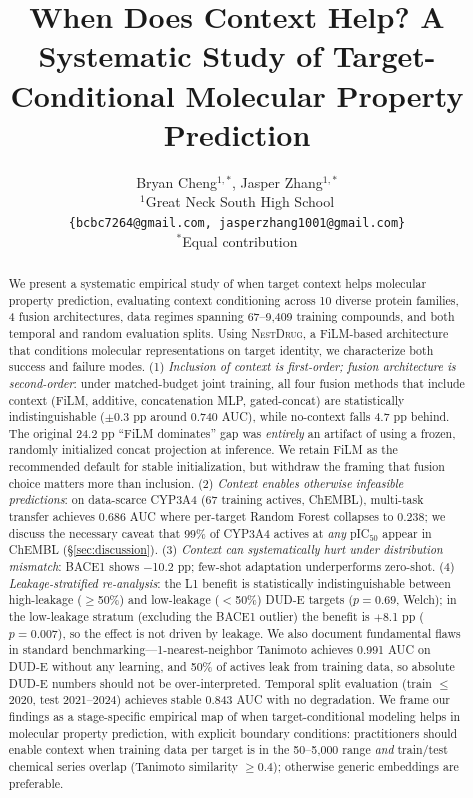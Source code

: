 \documentclass{article}
\title{When Does Context Help? A Systematic Study of Target-Conditional Molecular Property Prediction}
\author{Bryan Cheng$^{1,*}$, Jasper Zhang$^{1,*}$ \\
$^{1}$Great Neck South High School \\
\texttt{\{bcbc7264@gmail.com, jasperzhang1001@gmail.com\}} \\
$^{*}$Equal contribution
}
\newcommand{\methodname}{\textsc{NestDrug}}
\begin{document}
\maketitle
{}

\begin{abstract}
We present a systematic empirical study of when target context helps molecular property prediction, evaluating context conditioning across 10 diverse protein families, 4 fusion architectures, data regimes spanning 67--9,409 training compounds, and both temporal and random evaluation splits. Using \methodname{}, a FiLM-based architecture that conditions molecular representations on target identity, we characterize both success and failure modes. (1) \textit{Inclusion of context is first-order; fusion architecture is second-order}: under matched-budget joint training, all four fusion methods that include context (FiLM, additive, concatenation MLP, gated-concat) are statistically indistinguishable ($\pm 0.3$ pp around 0.740 AUC), while no-context falls 4.7 pp behind. The original 24.2 pp ``FiLM dominates'' gap was \emph{entirely} an artifact of using a frozen, randomly initialized concat projection at inference. We retain FiLM as the recommended default for stable initialization, but withdraw the framing that fusion choice matters more than inclusion. (2) \textit{Context enables otherwise infeasible predictions}: on data-scarce CYP3A4 (67 training actives, ChEMBL), multi-task transfer achieves 0.686 AUC where per-target Random Forest collapses to 0.238; we discuss the necessary caveat that 99\% of CYP3A4 actives at \emph{any} pIC$_{50}$ appear in ChEMBL (\S\ref{sec:discussion}). (3) \textit{Context can systematically hurt under distribution mismatch}: BACE1 shows $-$10.2 pp; few-shot adaptation underperforms zero-shot. (4) \textit{Leakage-stratified re-analysis}: the L1 benefit is statistically indistinguishable between high-leakage ($\geq$50\%) and low-leakage ($<$50\%) DUD-E targets ($p = 0.69$, Welch); in the low-leakage stratum (excluding the BACE1 outlier) the benefit is $+$8.1 pp ($p = 0.007$), so the effect is not driven by leakage. We also document fundamental flaws in standard benchmarking---1-nearest-neighbor Tanimoto achieves 0.991 AUC on DUD-E without any learning, and 50\% of actives leak from training data, so absolute DUD-E numbers should not be over-interpreted. Temporal split evaluation (train $\leq$2020, test 2021--2024) achieves stable 0.843 AUC with no degradation. We frame our findings as a stage-specific empirical map of when target-conditional modeling helps in molecular property prediction, with explicit boundary conditions: practitioners should enable context when training data per target is in the 50--5,000 range \emph{and} train/test chemical series overlap (Tanimoto similarity $\geq 0.4$); otherwise generic embeddings are preferable.
\end{abstract}
\end{document}
